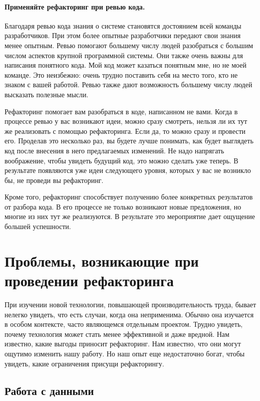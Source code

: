 \documentclass{../../text-style}
\begin{document}
\paragraph{Применяйте рефакторинг при ревью кода.} Благодаря ревью кода знания о системе становятся достоянием всей команды разработчиков. При этом более опытные разработчики передают свои знания менее опытным. Ревью помогают большему числу людей разобраться с большим числом аспектов крупной программной системы. Они также очень важны для написания понятного кода. Мой код может казаться понятным мне, но не моей команде. Это неизбежно: очень трудно поставить себя на место того, кто не знаком с вашей работой. Ревью также дают возможность большему числу людей высказать полезные мысли.

Рефакторинг помогает вам разобраться в коде, написанном не вами. Когда в процессе ревью у вас возникают идеи, можно сразу смотреть, нельзя ли их тут же реализовать с помощью рефакторинга. Если да, то можно сразу и провести его. Проделав это несколько раз, вы будете лучше понимать, как будет выглядеть код после внесения в него предлагаемых изменений. Не надо напрягать воображение, чтобы увидеть будущий код, это можно сделать уже теперь. В результате появляются уже идеи следующего уровня, которых у вас не возникло бы, не проведи вы рефакторинг.

Кроме того, рефакторинг способствует получению более конкретных результатов от разбора кода. В его процессе не только возникают новые предложения, но многие из них тут же реализуются. В результате это мероприятие дает ощущение большей успешности.

\section{Проблемы, возникающие при проведении рефакторинга}

При изучении новой технологии, повышающей производительность труда, бывает нелегко увидеть, что есть случаи, когда она неприменима. Обычно она изучается в особом контексте, часто являющемся отдельным проектом. Трудно увидеть, почему технология может стать менее эффективной и даже вредной. Нам известно, какие выгоды приносит рефакторинг. Нам известно, что они могут ощутимо изменить нашу работу. Но наш опыт еще недостаточно богат, чтобы увидеть, какие ограничения присущи рефакторингу.

\subsection{Работа с данными}
\end{document}
